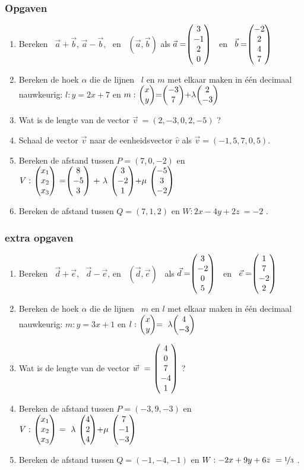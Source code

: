 \subsubsection{Opgaven}
\begin{enumerate}
	\item  Bereken \ $ \vec{a} + \vec{b} $, \quad $ \vec{a} - \vec{b} $, \ en \ $  (\vec{a} , \vec{b}) $  als $ \vec{a} = \vecvier{3}{-1}{2}{0}  $ \  en \  $  \vec{b} =  \vecvier{-2}{2}{4}{7} $
	
	\item  Bereken de hoek $\alpha$ die de  lijnen \ $  l $ en $ m $ met elkaar maken in één decimaal nauwkeurig:
	$ l:  y = 2x +7  $ en $ m: \  \vectwee{x}{y} = \vectwee{-3}{7} + \lambda \vectwee{2}{-3}  $
	
	\item Wat is de lengte van de vector $  \vec{v} \ = (2, -3, 0, 2, -5) $ ?
	
	\item Schaal de vector $  \vec{v} $ naar de eenheidsvector $\hat{v}$
	als $  \vec{v} = (-1, 5, 7, 0, 5) $.
	
	\item Bereken de afstand tussen  $  P = (7,0,-2)  $ en 
	$ V: \ \vecdriesnel{x} \
	=  \vecdrie {8} {-5} {3}  \
	+  \ \lambda \ \vecdrie{3}{-2}{1} 
	+ \mu \  \vecdrie{-5}{3}{-2} $ 
	
	\item   Bereken de afstand tussen  $  Q = (7,1,2)  $ en 
	$ W:2x - 4y +2z \ = -2 $ .
	
\end{enumerate}

\subsubsection{extra opgaven}
\begin{enumerate}
	\item Bereken 
	\ $ \vec{d} + \vec{e} $, \ $ \vec{d} - \vec{e} $, en \ $  (\vec{d} , \vec{e}) $ \ als 
	\quad $ \vec{d} = \vecvier{3}{-2}{0}{5}  $ \  en \  $  \vec{e} =  \vecvier{1}{7}{-2}{2} $ 	
	
	\item  Bereken de hoek $\alpha$ die de  lijnen \ $  m $ en $ l $ met elkaar maken in één decimaal nauwkeurig:
	$ m:  y = 3x + 1  $ en $ l: \  \vectwee{x}{y} = \  \lambda \vectwee{4}{-3}  $
	
	\item Wat is de lengte van de vector $  \vec{w} \ = \ \vecvijf{4}{0}{7}{-4}{1} $ ?
	
	\item Bereken de afstand tussen  $  P = (-3,9,-3)  $ en 
	$ V: \ \vecdriesnel{x} \ =  \ \lambda \ \vecdrie{4}{2}{4} + \mu \  \vecdrie{7}{-1}{-3} $	
	
	\item   Bereken de afstand tussen  $  Q = (-1,-4,-1)  $ en 
	$ W: -2x + 9y + 6z \ = \nicefrac{1}{3} $ .
\end{enumerate}



